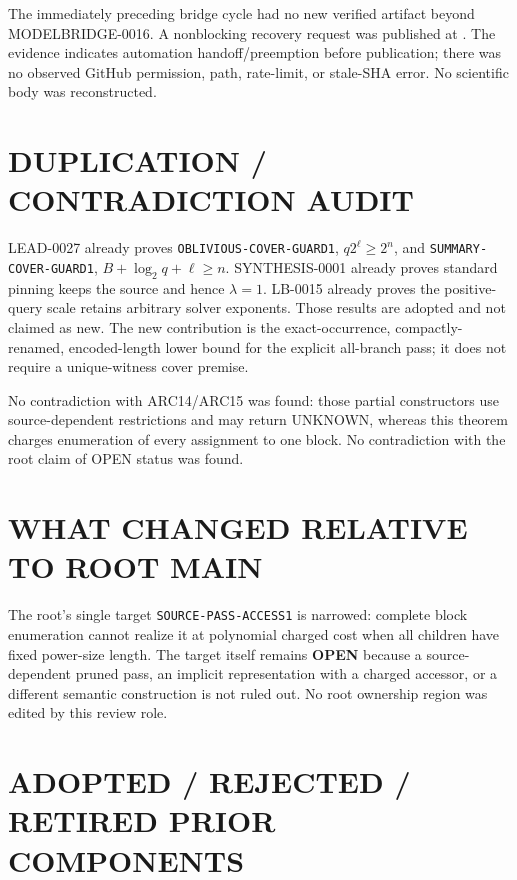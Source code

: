 \documentclass[11pt]{article}
\newcommand{\OPEN}{\textbf{OPEN}}
\begin{document}
The immediately preceding bridge cycle had no new verified artifact beyond
MODELBRIDGE-0016.  A nonblocking recovery request was published at
.
The evidence indicates automation handoff/preemption before publication;
there was no observed GitHub permission, path, rate-limit, or stale-SHA
error.  No scientific body was reconstructed.

\section{DUPLICATION / CONTRADICTION AUDIT}

LEAD-0027 already proves \texttt{OBLIVIOUS-COVER-GUARD1},
$q2^\ell\ge2^n$, and \texttt{SUMMARY-COVER-GUARD1},
$B+\log_2q+\ell\ge n$.  SYNTHESIS-0001 already proves standard pinning keeps
the source and hence $\lambda=1$.  LB-0015 already proves the positive-query
scale retains arbitrary solver exponents.  Those results are adopted and
not claimed as new.  The new contribution is the exact-occurrence,
compactly-renamed, encoded-length lower bound for the explicit all-branch
pass; it does not require a unique-witness cover premise.

No contradiction with ARC14/ARC15 was found: those partial constructors use
source-dependent restrictions and may return UNKNOWN, whereas this theorem
charges enumeration of every assignment to one block.  No contradiction
with the root claim of OPEN status was found.

\section{WHAT CHANGED RELATIVE TO ROOT MAIN}

The root's single target \texttt{SOURCE-PASS-ACCESS1} is narrowed: complete
block enumeration cannot realize it at polynomial charged cost when all
children have fixed power-size length.  The target itself remains \OPEN{}
because a source-dependent pruned pass, an implicit representation with a
charged accessor, or a different semantic construction is not ruled out.
No root ownership region was edited by this review role.

\section{ADOPTED / REJECTED / RETIRED PRIOR COMPONENTS}
\end{document}
